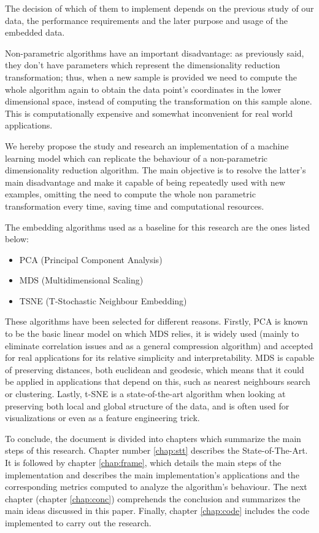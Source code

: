 \documentclass[a4paper,11pt,spanish]{report}
\begin{document}
The decision of which of them to implement depends on the previous study of our data, the performance requirements and the later purpose and usage of the embedded data.

Non-parametric algorithms have an important disadvantage: as previously said, they don't have parameters which represent the dimensionality reduction transformation; thus, when a new sample is provided we need to compute the whole algorithm again to obtain the data point's coordinates in the lower dimensional space, instead of computing the transformation on this sample alone. This is computationally expensive and somewhat inconvenient for real world applications.

We hereby propose the study and research an implementation of a machine learning model which can replicate the behaviour of a non-parametric dimensionality reduction algorithm. The main objective is to resolve the latter's main disadvantage and make it capable of being repeatedly used with new examples, omitting the need to compute the whole non parametric transformation every time, saving time and computational resources.

The embedding algorithms used as a baseline for this research are the ones listed below:

\renewcommand{\labelitemi}{\textendash}
\begin{itemize}
\item PCA (Principal Component Analysis)
\item MDS (Multidimensional Scaling)
\item TSNE (T-Stochastic Neighbour Embedding)
\end{itemize}

These algorithms have been selected for different reasons. Firstly, PCA is known to be the basic linear model on which MDS relies, it is widely used (mainly to eliminate correlation issues and as a general compression algorithm) and accepted for real applications for its relative simplicity and interpretability. MDS is capable of preserving distances, both euclidean and geodesic, which means that it could be applied in applications that depend on this, such as nearest neighbours search or clustering. Lastly, t-SNE is a state-of-the-art algorithm when looking at preserving both local and global structure of the data, and is often used for visualizations or even as a feature engineering trick.

To conclude, the document is divided into chapters which summarize the main steps of this research. Chapter number \ref{chap:stt} describes the State-of-The-Art. It is followed by chapter \ref{chap:frame}, which details the main steps of the implementation and describes the main implementation's applications and the corresponding metrics computed to analyze the algorithm's behaviour. The next chapter (chapter \ref{chap:conc}) comprehends the conclusion and summarizes the main ideas discussed in this paper. Finally, chapter \ref{chap:code} includes the code implemented to carry out the research.
\end{document}
